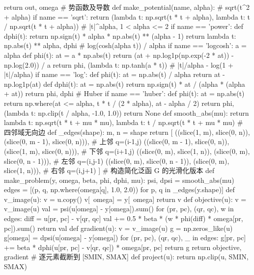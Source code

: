 \documentclass{JXUSTmodeling}
\begin{document}
\begin{appendixx}
\begin{python}[
	frame=single,
	breaklines=true,
	breakatwhitespace=false,
	caption={utils.py},
	label={lst:constant}
	]
    return out, omega
# 势函数及导数
def make_potential(name, alpha):
    # sqrt(t^2 + alpha)
    if name == 'sqrt':
        return (lambda t: np.sqrt(t * t + alpha),
                lambda t: t / np.sqrt(t * t + alpha))
    # |t|^alpha, 1 < alpha <= 2
    if name == 'power':
        def dphi(t):
            return np.sign(t) * alpha * np.abs(t) ** (alpha - 1)
        return lambda t: np.abs(t) ** alpha, dphi
    # log(cosh(alpha t)) / alpha
    if name == 'logcosh':
        a = alpha
        def phi(t):
            at = a * np.abs(t)
            return (at + np.log1p(np.exp(-2 * at)) - np.log(2.0)) / a
        return phi, (lambda t: np.tanh(a * t))
    # |t|/alpha - log(1 + |t|/alpha)
    if name == 'log':
        def phi(t):
            at = np.abs(t) / alpha
            return at - np.log1p(at)
        def dphi(t):
            at = np.abs(t)
            return np.sign(t) * at / (alpha * (alpha + at))
        return phi, dphi
    # Huber
    if name == 'huber':
        def phi(t):
            at = np.abs(t)
            return np.where(at <= alpha, t * t / (2 * alpha), at - alpha / 2)
        return phi, (lambda t: np.clip(t / alpha, -1.0, 1.0))
    return None
def smooth_abs(mu):
    return lambda t: np.sqrt(t * t + mu * mu), lambda t: t / np.sqrt(t * t + mu * mu)
# 四邻域无向边
def _edges(shape):
    m, n = shape
    return [
        ((slice(1, m), slice(0, n)), (slice(0, m - 1), slice(0, n))),   # 上邻 q=(i-1,j)
        ((slice(0, m - 1), slice(0, n)), (slice(1, m), slice(0, n))),   # 下邻 q=(i+1,j)
        ((slice(0, m), slice(1, n)), (slice(0, m), slice(0, n - 1))),   # 左邻 q=(i,j-1)
        ((slice(0, m), slice(0, n - 1)), (slice(0, m), slice(1, n))),   # 右邻 q=(i,j+1)
    ]
# 构造简化泛函 G 的光滑化版本
def make_problem(y, omega, beta, phi, dphi, mu):
    psi, dpsi = smooth_abs(mu)
    edges = [(p, q, np.where(omega[q], 1.0, 2.0)) for p, q in _edges(y.shape)]
    def v_image(u):
        v = u.copy()
        v[~omega] = y[~omega]
        return v
    def objective(u):
        v = v_image(u)
        val = psi(u[omega] - y[omega]).sum()
        for (pr, pc), (qr, qc), w in edges:
            diff = u[pr, pc] - v[qr, qc]
            val += 0.5 * beta * (w * phi(diff) * omega[pr, pc]).sum()
        return val
    def gradient(u):
        v = v_image(u)
        g = np.zeros_like(u)
        g[omega] = dpsi(u[omega] - y[omega])
        for (pr, pc), (qr, qc), _ in edges:
            g[pr, pc] += beta * dphi(u[pr, pc] - v[qr, qc]) * omega[pr, pc]
        return g
    return objective, gradient
# 逐元素截断到 [SMIN, SMAX]
def project(u):
    return np.clip(u, SMIN, SMAX)

\end{python}
\end{appendixx}
\end{document}
